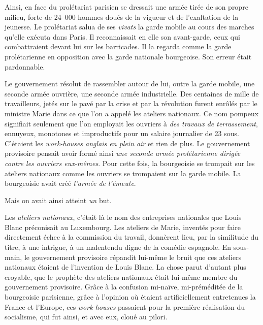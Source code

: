 \documentclass[twoside]{book} %
\begin{document}
Ainsi, en face du prolétariat parisien se dressait une armée tirée de son propre milieu, forte de 24 000 hommes doués de la vigueur et de l’exaltation de la jeunesse. Le prolétariat salua de ses \emph{vivats} la garde mobile au cours des marches qu’elle exécuta dans Paris. Il reconnaissait en elle son avant-garde, ceux qui combattraient devant lui sur les barricades. Il la regarda comme la garde prolétarienne en opposition avec la garde nationale bourgeoise. Son erreur était pardonnable.\par
Le gouvernement résolut de rassembler autour de lui, outre la garde mobile, une seconde armée ouvrière, une seconde armée industrielle. Des centaines de mille de travailleurs, jetés sur le pavé par la crise et par la révolution furent enrôlés par le ministre Marie dans ce que l’on a appelé les ateliers nationaux. Ce nom pompeux signifiait seulement que l’on employait les ouvriers à \emph{des travaux de terrassement}, ennuyeux, monotones et improductifs pour un salaire journalier de 23 sous. C’étaient les \emph{work-houses anglais en plein air} et rien de plus. Le gouvernement provisoire pensait avoir formé ainsi \emph{une seconde armée prolétarienne dirigée contre les ouvriers eux-mêmes}. Pour cette fois, la bourgeoisie se trompait sur les ateliers nationaux comme les ouvriers se trompaient sur la garde mobile. La bourgeoisie avait créé \emph{l’armée de l’émeute}.\par
Mais on avait ainsi atteint \emph{un} but.\par
Les \emph{ateliers nationaux}, c’était là le nom des entreprises nationales que Louis Blanc préconisait au Luxembourg. Les ateliers de Marie, inventés pour faire directement échec à la commission du travail, donnèrent lieu, par la similitude du titre, à une intrigue, à un malentendu digne de la comédie espagnole. En sous-main, le gouvernement provisoire répandit lui-même le bruit que ces ateliers nationaux étaient de l’invention de Louis Blanc. La chose parut d’autant plus croyable, que le prophète des ateliers nationaux était lui-même membre du gouvernement provisoire. Grâce à la confusion mi-naïve, mi-préméditée de la bourgeoisie parisienne, grâce à l’opinion où étaient artificiellement entretenues la France et l’Europe, ces \emph{work-houses} passaient pour la première réalisation du socialisme, qui fut ainsi, et avec eux, cloué au pilori.\par
\end{document}
